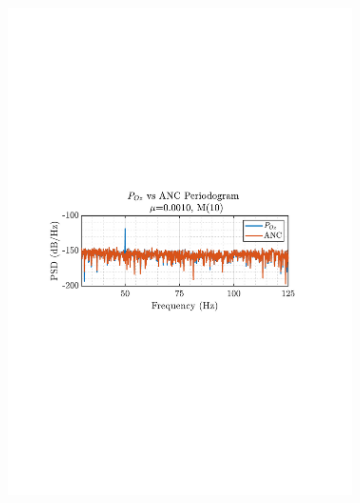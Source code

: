 \documentclass[12pt]{article}
\begin{document}
			\begin{figure}[H]
				\centering
				\begin{subfigure}{0.49\textwidth}
					\centering
					\includegraphics[trim={2.2cm 11.2cm 3.15cm  11.2cm}, clip, width=\textwidth]{../MATLAB/figures/q2_3d_fig02.pdf} 
					\captionsetup{justification=centering}
				\end{subfigure}
				\begin{subfigure}{0.49\textwidth}
					\centering

\end{subfigure}
\end{figure}
\end{document}
